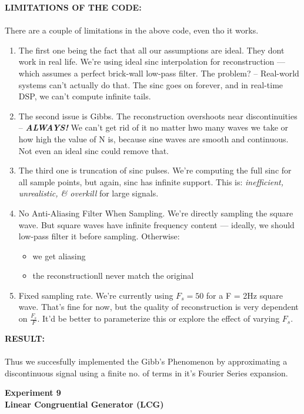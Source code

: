 \documentclass[12pt]{report}
\begin{document}
  \noindent \textbf{LIMITATIONS OF THE CODE:} \\ \\
  There are a couple of limitations in the above code, even tho it works. 
  \begin{enumerate}
    \item The first one being the fact that all our assumptions are ideal. They dont work in real life. We're using ideal sinc interpolation for reconstruction — which assumes a perfect brick-wall low-pass filter. The problem? -- Real-world systems can’t actually do that. The sinc goes on forever, and in real-time DSP, we can’t compute infinite tails.
    \item The second issue is Gibbs. The reconstruction overshoots near discontinuities -- \textbf{\textit{ALWAYS!}} We can't get rid of it no matter hwo many waves we take or how high the value of N is, because sine waves are smooth and continuous. Not even an ideal sinc could remove that. \cite{chatgpt}
    \item The third one is truncation of sinc pulses. We're computing the full sinc for all sample points, but again, sinc has infinite support. This is: \textit{inefficient, unrealistic, \& overkill} for large signals.\cite{chatgpt}
    \item No Anti-Aliasing Filter When Sampling. We're directly sampling the square wave. But square waves have infinite frequency content — ideally, we should low-pass filter it before sampling. Otherwise: 
      \begin{itemize}
        \item we get aliasing 
        \item the reconstructionll never match the original
      \end{itemize}
    \item Fixed sampling rate. We're currently using $F_s = 50$ for a F = 2Hz square wave. That's fine for now, but the quality of reconstruction is very dependent on $\frac{F_s}{F}$. It'd be better to parameterize this or explore the effect of varying $F_s$. \cite{chatgpt}
  \end{enumerate}
  \vspace{0.5in}
  \noindent \textbf{RESULT:} \\ \\

  Thus we succesfully implemented the Gibb's Phenomenon by approximating a discontinuous signal using a finite no. of terms in it’s Fourier Series expansion.
  \newpage 
  \begin{center}
    \textbf{\LARGE Experiment 9} \\
    \vspace{0.2cm}
    \textbf{\large Linear Congruential Generator (LCG)}
  \end{center}
\end{document}
